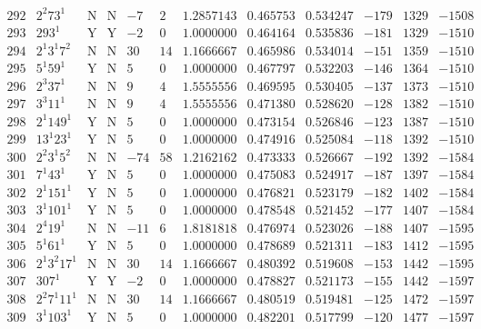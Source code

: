 \documentclass[11pt,reqno,a4letter]{article}
\numberwithin{figure}{section}
\numberwithin{table}{section}
\theoremstyle{plain}
\numberwithin{theorem}{section}
\theoremstyle{definition}
\begin{document}
\begin{table}[ht]
\begin{equation*}
{\begin{array}{cc|cc|ccc|cc|ccc}
 292 & 2^2 73^1 & \text{N} & \text{N} & -7 & 2 & 1.2857143 & 0.465753 & 0.534247 & -179 & 1329 & -1508 \\
 293 & 293^1 & \text{Y} & \text{Y} & -2 & 0 & 1.0000000 & 0.464164 & 0.535836 & -181 & 1329 & -1510 \\
 294 & 2^1 3^1 7^2 & \text{N} & \text{N} & 30 & 14 & 1.1666667 & 0.465986 & 0.534014 & -151 & 1359 & -1510 \\
 295 & 5^1 59^1 & \text{Y} & \text{N} & 5 & 0 & 1.0000000 & 0.467797 & 0.532203 & -146 & 1364 & -1510 \\
 296 & 2^3 37^1 & \text{N} & \text{N} & 9 & 4 & 1.5555556 & 0.469595 & 0.530405 & -137 & 1373 & -1510 \\
 297 & 3^3 11^1 & \text{N} & \text{N} & 9 & 4 & 1.5555556 & 0.471380 & 0.528620 & -128 & 1382 & -1510 \\
 298 & 2^1 149^1 & \text{Y} & \text{N} & 5 & 0 & 1.0000000 & 0.473154 & 0.526846 & -123 & 1387 & -1510 \\
 299 & 13^1 23^1 & \text{Y} & \text{N} & 5 & 0 & 1.0000000 & 0.474916 & 0.525084 & -118 & 1392 & -1510 \\
 300 & 2^2 3^1 5^2 & \text{N} & \text{N} & -74 & 58 & 1.2162162 & 0.473333 & 0.526667 & -192 & 1392 & -1584 \\
 301 & 7^1 43^1 & \text{Y} & \text{N} & 5 & 0 & 1.0000000 & 0.475083 & 0.524917 & -187 & 1397 & -1584 \\
 302 & 2^1 151^1 & \text{Y} & \text{N} & 5 & 0 & 1.0000000 & 0.476821 & 0.523179 & -182 & 1402 & -1584 \\
 303 & 3^1 101^1 & \text{Y} & \text{N} & 5 & 0 & 1.0000000 & 0.478548 & 0.521452 & -177 & 1407 & -1584 \\
 304 & 2^4 19^1 & \text{N} & \text{N} & -11 & 6 & 1.8181818 & 0.476974 & 0.523026 & -188 & 1407 & -1595 \\
 305 & 5^1 61^1 & \text{Y} & \text{N} & 5 & 0 & 1.0000000 & 0.478689 & 0.521311 & -183 & 1412 & -1595 \\
 306 & 2^1 3^2 17^1 & \text{N} & \text{N} & 30 & 14 & 1.1666667 & 0.480392 & 0.519608 & -153 & 1442 & -1595 \\
 307 & 307^1 & \text{Y} & \text{Y} & -2 & 0 & 1.0000000 & 0.478827 & 0.521173 & -155 & 1442 & -1597 \\
 308 & 2^2 7^1 11^1 & \text{N} & \text{N} & 30 & 14 & 1.1666667 & 0.480519 & 0.519481 & -125 & 1472 & -1597 \\
 309 & 3^1 103^1 & \text{Y} & \text{N} & 5 & 0 & 1.0000000 & 0.482201 & 0.517799 & -120 & 1477 & -1597 \\

\end{array}}
\end{equation*}
\end{table}
\end{document}
